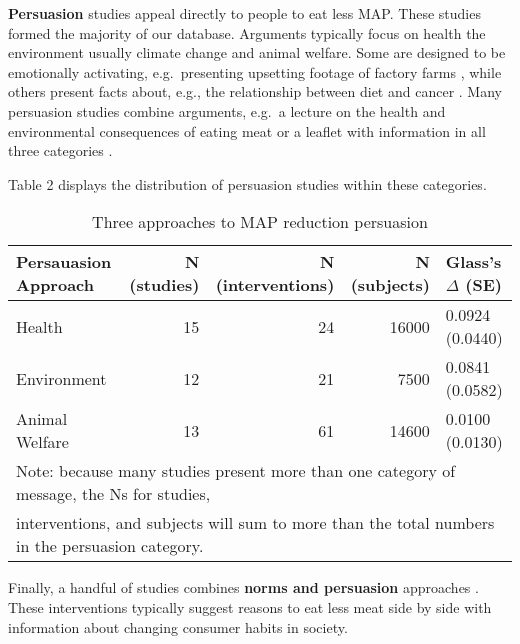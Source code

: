 \documentclass[sn-nature,pdflatex]{sn-jnl}
\begin{document}
\textbf{Persuasion} studies
\citep{kanchanachitra2020, abrahamse2007, acharya2004, berndsen2005, bertolaso2015, bianchi2022, bochmann2017, bschaden2020, carfora2023, cooney2016, fehrenbach2015, feltz2022, haile2021, hatami2018, hennessy2016, mathur2021effectiveness, norris2014, peacock2017, polanco2022, sparkman2021, jalil2023, merrill2009, weingarten2022}
appeal directly to people to eat less MAP. These studies formed the
majority of our database. Arguments typically focus on health the
environment \textemdash usually climate change \textemdash and animal
welfare. Some are designed to be emotionally activating, e.g.~presenting
upsetting footage of factory farms \citep{bertolaso2015}, while others
present facts about, e.g., the relationship between diet and cancer
\citep{hatami2018}. Many persuasion studies combine arguments, e.g.~a
lecture on the health and environmental consequences of eating meat
\citep{jalil2023} or a leaflet with information in all three categories
\citep{hennessy2016}.

Table 2 displays the distribution of persuasion studies within these
categories.

\begin{table}[!h]
\centering
\caption{\label{tab:tab:table_two}Three approaches to MAP reduction persuasion}
\centering
\begin{tabular}[t]{lrrrl}
\toprule
Persauasion Approach & N (studies) & N (interventions) & N (subjects) & Glass's $\Delta$ (SE)\\
\midrule
Health & 15 & 24 & 16000 & 0.0924 (0.0440)\\
Environment & 12 & 21 & 7500 & 0.0841 (0.0582)\\
Animal Welfare & 13 & 61 & 14600 & 0.0100 (0.0130)\\
\bottomrule
\multicolumn{5}{l}{\textsuperscript{} Note: because many studies present more than one category of message, the Ns for studies, \linebreak}\\
\multicolumn{5}{l}{interventions, and subjects will sum to more than the total numbers in the persuasion category.}\\
\end{tabular}
\end{table}

Finally, a handful of studies combines \textbf{norms and persuasion}
approaches \citep{hennessy2016, carfora2023, mattson2020, piester2020}.
These interventions typically suggest reasons to eat less meat side by
side with information about changing consumer habits in society.
\end{document}
